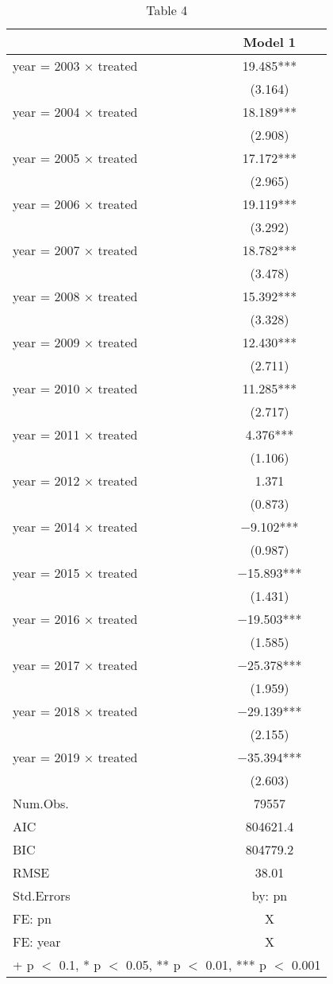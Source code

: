 \begin{table}

\caption{\label{tab:unnamed-chunk-1}Table 4}
\centering
\begin{tabular}[t]{lc}
\toprule
  & Model 1\\
\midrule
year = 2003 × treated & \num{19.485}***\\
 & (\num{3.164})\\
year = 2004 × treated & \num{18.189}***\\
 & (\num{2.908})\\
year = 2005 × treated & \num{17.172}***\\
 & (\num{2.965})\\
year = 2006 × treated & \num{19.119}***\\
 & (\num{3.292})\\
year = 2007 × treated & \num{18.782}***\\
 & (\num{3.478})\\
year = 2008 × treated & \num{15.392}***\\
 & (\num{3.328})\\
year = 2009 × treated & \num{12.430}***\\
 & (\num{2.711})\\
year = 2010 × treated & \num{11.285}***\\
 & (\num{2.717})\\
year = 2011 × treated & \num{4.376}***\\
 & (\num{1.106})\\
year = 2012 × treated & \num{1.371}\\
 & (\num{0.873})\\
year = 2014 × treated & \num{-9.102}***\\
 & (\num{0.987})\\
year = 2015 × treated & \num{-15.893}***\\
 & (\num{1.431})\\
year = 2016 × treated & \num{-19.503}***\\
 & (\num{1.585})\\
year = 2017 × treated & \num{-25.378}***\\
 & (\num{1.959})\\
year = 2018 × treated & \num{-29.139}***\\
 & (\num{2.155})\\
year = 2019 × treated & \num{-35.394}***\\
 & (\num{2.603})\\
\midrule
Num.Obs. & \num{79557}\\
AIC & \num{804621.4}\\
BIC & \num{804779.2}\\
RMSE & \num{38.01}\\
Std.Errors & by: pn\\
FE: pn & X\\
FE: year & X\\
\bottomrule
\multicolumn{2}{l}{\rule{0pt}{1em}+ p $<$ 0.1, * p $<$ 0.05, ** p $<$ 0.01, *** p $<$ 0.001}\\
\end{tabular}
\end{table}
